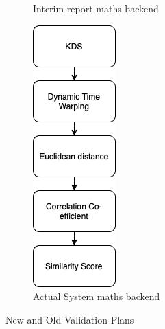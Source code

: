 \documentclass[10pt,a4paper]{report}
\begin{document}
\begin{figure}
\begin{subfigure}[b]{0.3\textwidth}
		\caption{Interim report maths backend}
		\label{fig:IRMB}
	\end{subfigure}
	\hfill
	\begin{subfigure}[b]{0.3\textwidth}
		\centering
		\includegraphics[width=\textwidth]{NewMaths}
		\caption{Actual System maths backend}
		\label{fig:ACMB}
	\end{subfigure}
	\caption{New and Old Validation Plans}
	\label{fig:ValPlans}
\end{figure}
\end{document}
